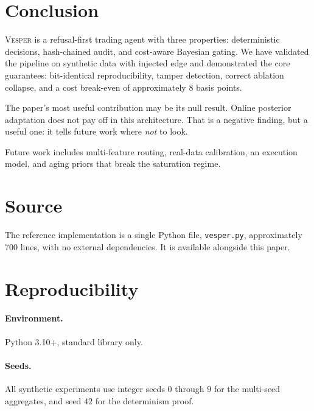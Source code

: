 \documentclass[11pt,a4paper]{article}
\newcommand{\cel}[1]{\textcolor{celadon}{#1}}
\theoremstyle{definition}
\begin{document}
\section{Conclusion}
\label{sec:conclusion}

\textsc{Vesper} is a refusal-first trading agent with three properties: deterministic decisions, hash-chained audit, and cost-aware Bayesian gating. We have validated the pipeline on synthetic data with injected edge and demonstrated the core guarantees: bit-identical reproducibility, tamper detection, correct ablation collapse, and a cost break-even of approximately 8 basis points.

The paper's most useful contribution may be its \cel{null result}. Online posterior adaptation does not pay off in this architecture. That is a negative finding, but a useful one: it tells future work where \emph{not} to look.

Future work includes multi-feature routing, real-data calibration, an execution model, and aging priors that break the saturation regime.

\appendix

\section{Source}
\label{app:source}

The reference implementation is a single Python file, \texttt{vesper.py}, approximately 700 lines, with no external dependencies. It is available alongside this paper.

\section{Reproducibility}
\label{app:repro}

\paragraph{Environment.} Python 3.10+, standard library only.

\paragraph{Seeds.} All synthetic experiments use integer seeds $0$ through $9$ for the multi-seed aggregates, and seed $42$ for the determinism proof.
\end{document}
